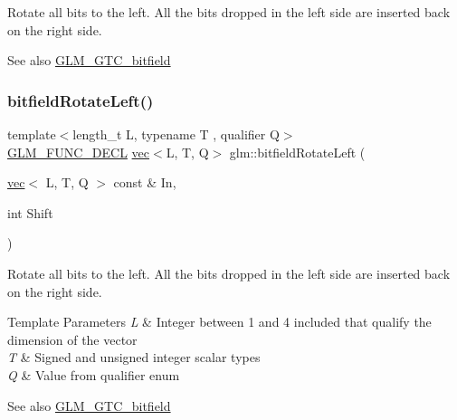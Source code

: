 Rotate all bits to the left. All the bits dropped in the left side are inserted back on the right side.

\begin{DoxySeeAlso}{See also}
\hyperlink{group__gtc__bitfield}{G\+L\+M\+\_\+\+G\+T\+C\+\_\+bitfield} 
\end{DoxySeeAlso}
\mbox{\label{group__gtc__bitfield_gae186317091b1a39214ebf79008d44a1e}} 
\subsubsection{\texorpdfstring{bitfield\+Rotate\+Left()}{bitfieldRotateLeft()}\hspace{0.1cm}{\footnotesize\ttfamily [2/2]}}
{\footnotesize\ttfamily template$<$length\+\_\+t L, typename T , qualifier Q$>$ \\
\hyperlink{setup_8hpp_ab2d052de21a70539923e9bcbf6e83a51}{G\+L\+M\+\_\+\+F\+U\+N\+C\+\_\+\+D\+E\+CL} \hyperlink{structglm_1_1vec}{vec}$<$L, T, Q$>$ glm\+::bitfield\+Rotate\+Left (\begin{DoxyParamCaption}\item[{\hyperlink{structglm_1_1vec}{vec}$<$ L, T, Q $>$ const \&}]{In,  }\item[{int}]{Shift }\end{DoxyParamCaption})}

Rotate all bits to the left. All the bits dropped in the left side are inserted back on the right side.


\begin{DoxyTemplParams}{Template Parameters}
{\em L} & Integer between 1 and 4 included that qualify the dimension of the vector \\
\hline
{\em T} & Signed and unsigned integer scalar types \\
\hline
{\em Q} & Value from qualifier enum\\
\hline
\end{DoxyTemplParams}
\begin{DoxySeeAlso}{See also}
\hyperlink{group__gtc__bitfield}{G\+L\+M\+\_\+\+G\+T\+C\+\_\+bitfield} 
\end{DoxySeeAlso}
\mbox{\label{group__gtc__bitfield_ga1c33d075c5fb8bd8dbfd5092bfc851ca}} 
